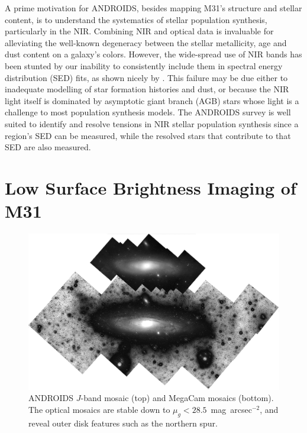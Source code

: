 \documentclass[11pt,twoside]{article}
\begin{document}
A prime motivation for ANDROIDS, besides mapping M31's structure and stellar content, is to understand the systematics of stellar population synthesis, particularly in the NIR.
Combining NIR and optical data is invaluable for alleviating the well-known degeneracy between the stellar metallicity, age and dust content on a galaxy's colors.
However, the wide-spread use of NIR bands has been stunted by our inability to consistently include them in spectral energy distribution (SED) fits, as shown nicely by \cite{Taylor:2011}.
This failure may be due either to inadequate modelling of star formation histories and dust, or because the NIR light itself is dominated by asymptotic giant branch (AGB) stars whose light is a challenge to most population synthesis models.
The ANDROIDS survey is well suited to identify and resolve tensions in NIR stellar population synthesis since a region's SED can be measured, while the resolved stars that contribute to that SED are also measured.

\section{Low Surface Brightness Imaging of M31}

\begin{figure}[t]
\centering
\includegraphics[width=\columnwidth]{mosaics}
\caption{ANDROIDS $J$-band mosaic (top) and MegaCam mosaics (bottom). The optical mosaics are stable down to $\mu_g<28.5$~mag~arcsec$^{-2}$, and reveal outer disk features such as the northern spur.}
\label{fig:mosaics}
\end{figure}
\end{document}
